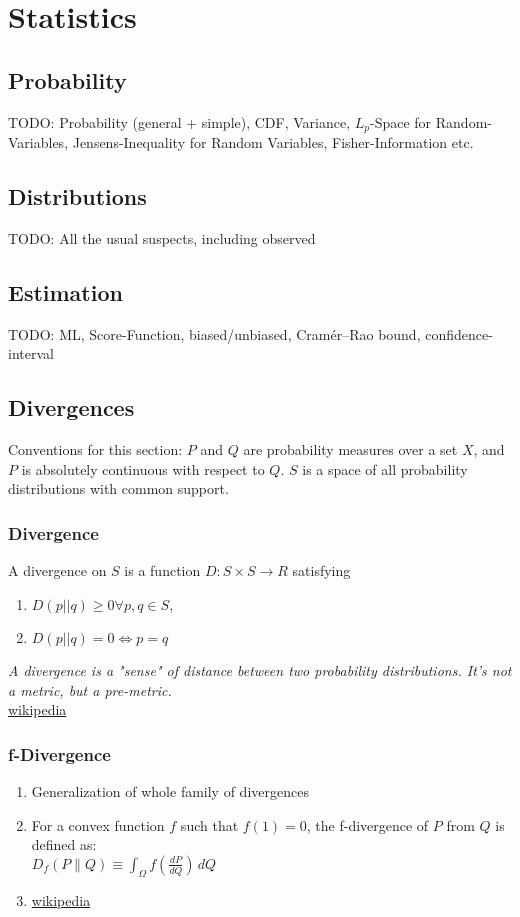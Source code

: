 \section{Statistics}

\theoremstyle{definition}
\newtheorem{definition}{Definition}[section]

\subsection{Probability}
TODO: Probability (general + simple), CDF, Variance, $L_p$-Space for Random-Variables, Jensens-Inequality for Random Variables, Fisher-Information etc.

\subsection{Distributions}
TODO: All the usual suspects, including observed

\subsection{Estimation}
TODO: ML, Score-Function, biased/unbiased, Cramér–Rao bound, confidence-interval

\subsection{Divergences}
Conventions for this section: $P$ and $Q$ are probability measures over a set $X$, and $P$ is absolutely continuous with respect to $Q$. $S$ is a space of all probability distributions with common support.
\subsubsection{Divergence}
A divergence on $S$ is a function $D: S \times S \rightarrow R$ satisfying
\begin{enumerate}
	\item $D(p || q) \geq 0  \forall p, q \in S$,
	\item $D(p || q) = 0 \Leftrightarrow p = q$
\end{enumerate}
\textit{A divergence is a "sense" of distance between two probability distributions. It's not a metric, but a pre-metric.}\\
\href{https://en.wikipedia.org/wiki/Divergence_(statistics)}{wikipedia}

\subsubsection{f-Divergence}
\begin{enumerate}
	\item Generalization of whole family of divergences
	\item For a convex function $f$ such that $f(1) = 0$, the f-divergence of $P$ from $Q$ is defined as:\\
	$D_{f}(P\parallel Q)\equiv \int _{{\Omega }}f\left({\frac{dP}{dQ}}\right)\,dQ$
	\item \href{https://en.wikipedia.org/wiki/Divergence_(statistics)}{wikipedia}
\end{enumerate}

